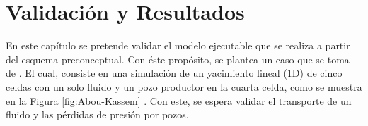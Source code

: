 \chapter{Validación y Resultados}\label{cap:Validacion}


En este capítulo se pretende validar el modelo ejecutable que se realiza a partir del esquema preconceptual. Con éste propósito, se plantea un caso que se toma de \cite{jamal2006petroleum}. El cual, consiste en una simulación de un yacimiento lineal (1D) de cinco celdas con un solo fluido y un pozo productor en la cuarta celda, como se muestra en la Figura \ref{fig:Abou-Kassem} \citep{jamal2006petroleum}. Con este, se espera validar el transporte de un fluido y las pérdidas de presión por pozos.\\

